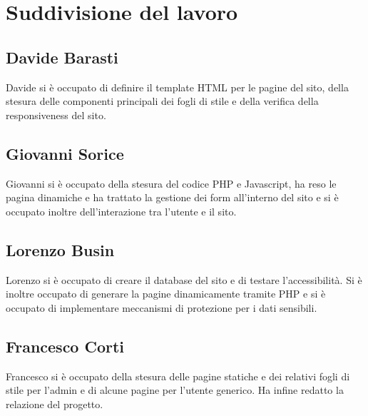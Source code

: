 \section{Suddivisione del lavoro}

\subsection{Davide Barasti}
Davide si è occupato di definire il template HTML per le pagine del sito, della stesura delle componenti principali dei fogli di stile e della verifica della responsiveness del sito.

\subsection{Giovanni Sorice}
Giovanni si è occupato della stesura del codice PHP e Javascript, ha reso le pagina dinamiche e ha trattato la gestione dei form all'interno del sito e si è occupato inoltre dell'interazione tra l'utente e il sito.

\subsection{Lorenzo Busin}
Lorenzo si è occupato di creare il database del sito e di testare l'accessibilità. Si è inoltre occupato di generare la pagine dinamicamente tramite PHP e si è occupato di implementare meccanismi di protezione per i dati sensibili.

\subsection{Francesco Corti}
Francesco si è occupato della stesura delle pagine statiche e dei relativi fogli di stile per l'admin e di alcune pagine per l'utente generico. Ha infine redatto la relazione del progetto. 